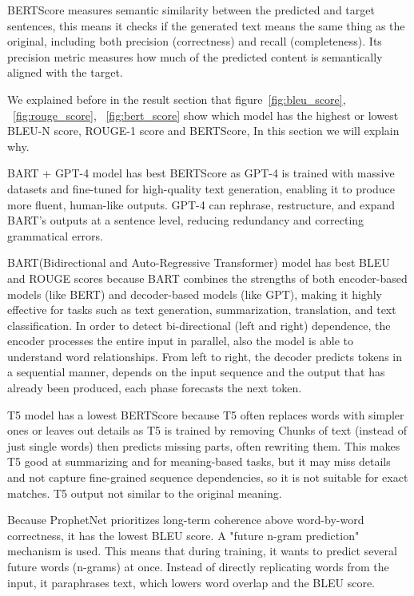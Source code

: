 \documentclass[journal]{IEEEtran}
\begin{document}
BERTScore measures semantic similarity between the predicted and target sentences, this means it checks if the generated text means the same thing as the original, including both precision (correctness) and recall (completeness). Its precision metric measures how much of the predicted content is semantically aligned with the target.


We explained before in the result section that figure~\ref{fig:bleu_score}, ~\ref{fig:rouge_score}, ~\ref{fig:bert_score} show which model has the highest or lowest BLEU-N score, ROUGE-1 score and BERTScore, In this section we will explain why.


BART + GPT-4 model has best BERTScore as GPT-4 is trained with massive datasets and fine-tuned for high-quality text generation, enabling it to produce more fluent, human-like outputs. GPT-4 can rephrase, restructure, and expand BART’s outputs at a sentence level, reducing redundancy and correcting grammatical errors.

BART(Bidirectional and Auto-Regressive Transformer) model has best  BLEU and ROUGE scores because BART  combines the strengths of both encoder-based models (like BERT) and decoder-based models (like GPT), making it highly effective for tasks such as text generation, summarization, translation, and text classification. In order to detect bi-directional (left and right) dependence, the encoder processes the entire input in parallel, also the model is able to understand word relationships. From left to right, the decoder predicts tokens in a sequential manner, depends on the input sequence and the output that has already been produced, each phase forecasts the next token.

T5 model has a lowest BERTScore because T5 often replaces words with simpler ones or leaves out details as T5 is trained by  removing Chunks of text (instead of just single words) then predicts missing parts, often rewriting them. This makes T5 good at summarizing and for meaning-based tasks, but it may miss details and not capture fine-grained sequence dependencies, so it is not suitable for exact matches. T5 output not similar to the original meaning.

Because ProphetNet prioritizes long-term coherence above word-by-word correctness, it has the lowest BLEU score. A "future n-gram prediction" mechanism is used. This means that during training, it wants to predict several future words (n-grams) at once. Instead of directly replicating words from the input, it paraphrases text, which lowers word overlap and the BLEU score.
\end{document}
